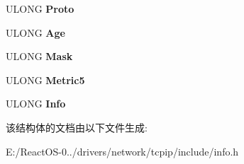 \begin{DoxyCompactItemize}
\mbox{\label{struct_i_p_r_o_u_t_e___e_n_t_r_y_ae7690e607a021e13dd73d26fe598c32c}} 
U\+L\+O\+NG {\bfseries Proto}
\item 
\mbox{\label{struct_i_p_r_o_u_t_e___e_n_t_r_y_af8fd002148be7bc3bf73fc01952509c8}} 
U\+L\+O\+NG {\bfseries Age}
\item 
\mbox{\label{struct_i_p_r_o_u_t_e___e_n_t_r_y_abe63c666227d3b6dedaa9bda354f1c4f}} 
U\+L\+O\+NG {\bfseries Mask}
\item 
\mbox{\label{struct_i_p_r_o_u_t_e___e_n_t_r_y_a0469360b66d58593391698ca33be20d9}} 
U\+L\+O\+NG {\bfseries Metric5}
\item 
\mbox{\label{struct_i_p_r_o_u_t_e___e_n_t_r_y_ae32b192dcc7ee832abe770d99d1bba63}} 
U\+L\+O\+NG {\bfseries Info}
\end{DoxyCompactItemize}


该结构体的文档由以下文件生成\+:\begin{DoxyCompactItemize}
\item 
E\+:/\+React\+O\+S-\/0../drivers/network/tcpip/include/info.\+h\end{DoxyCompactItemize}

